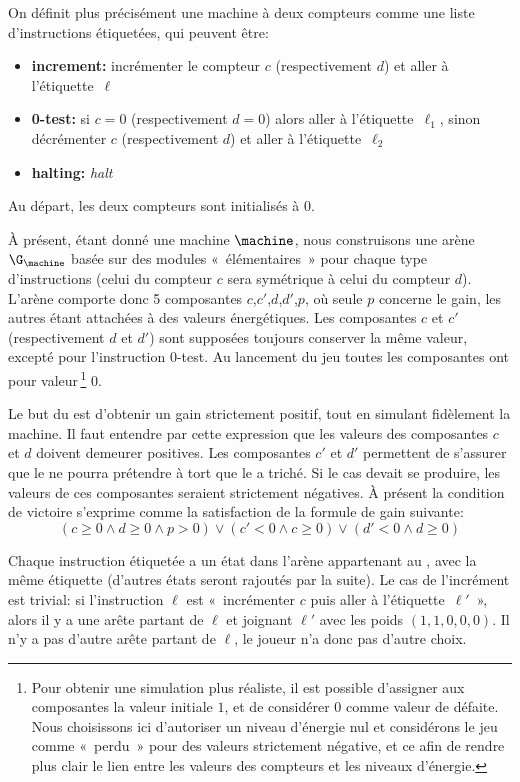 On définit plus précisément une machine à deux compteurs comme une liste d'instructions étiquetées, qui peuvent être:
\begin{itemize}
    \item \textbf{increment:} incrémenter le compteur $c$ (respectivement $d$) et aller à l'étiquette~$\ell$
    \item \textbf{0-test:} si $c=0$ (respectivement $d=0$) alors aller à l'étiquette~$\ell_1$, sinon décrémenter $c$ (respectivement $d$) et aller à l'étiquette~$\ell_2$
    \item \textbf{halting:} \emph{halt}
\end{itemize}
Au départ, les deux compteurs sont initialisés à $0$.

À présent, étant donné une machine $\machine$, nous construisons une arène $\G_\machine$ basée sur des modules « élémentaires » pour chaque type d'instructions (celui du compteur $c$ sera symétrique à celui du compteur $d$).
L'arène comporte donc 5 composantes $c$,$c'$,$d$,$d'$,$p$, où seule $p$ concerne le gain, les autres étant attachées à des valeurs énergétiques.
Les composantes $c$ et $c'$ (respectivement $d$ et $d'$) sont supposées toujours conserver la même valeur, excepté pour l'instruction $0$-test.
Au lancement du jeu toutes les composantes ont pour valeur\,\footnote{Pour obtenir une simulation plus réaliste, il est possible d'assigner aux composantes la valeur initiale $1$, et de considérer $0$ comme valeur de défaite. Nous choisissons ici d'autoriser un niveau d'énergie nul et considérons le jeu comme « perdu » pour des valeurs strictement négative, et ce afin de rendre plus clair le lien entre les valeurs des compteurs et les niveaux d'énergie.} $0$.

Le but du \jo est d'obtenir un gain strictement positif, tout en simulant fidèlement la machine.
Il faut entendre par cette expression que les valeurs des composantes $c$ et $d$ doivent demeurer positives.
Les composantes $c'$ et $d'$ permettent de s'assurer que le \ji ne pourra prétendre à tort que le \jo a triché.
Si le cas devait se produire, les valeurs de ces composantes seraient strictement négatives.
À présent la condition de victoire s'exprime comme la satisfaction de la formule de gain suivante:
\[(c\geq0 \wedge d\geq0 \wedge p>0) \vee (c'<0 \wedge c\geq0) \vee (d'<0 \wedge d\geq0)\]

Chaque instruction étiquetée a un état dans l'arène appartenant au \jo, avec la même étiquette (d'autres états seront rajoutés par la suite).
Le cas de l'incrément est trivial: si l'instruction $\ell$ est « incrémenter $c$ puis aller à l'étiquette~$\ell'$ », alors il y a une arête partant de $\ell$ et joignant $\ell'$ avec les poids $(1,1,0,0,0)$.
Il n'y a pas d'autre arête partant de $\ell$, le joueur n'a donc pas d'autre choix.

